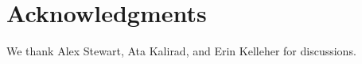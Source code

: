 \documentclass[9pt,lineno]{elife}
\begin{document}


\section{Acknowledgments}

We thank Alex Stewart, Ata Kalirad, and Erin Kelleher for discussions.  




\end{document}
